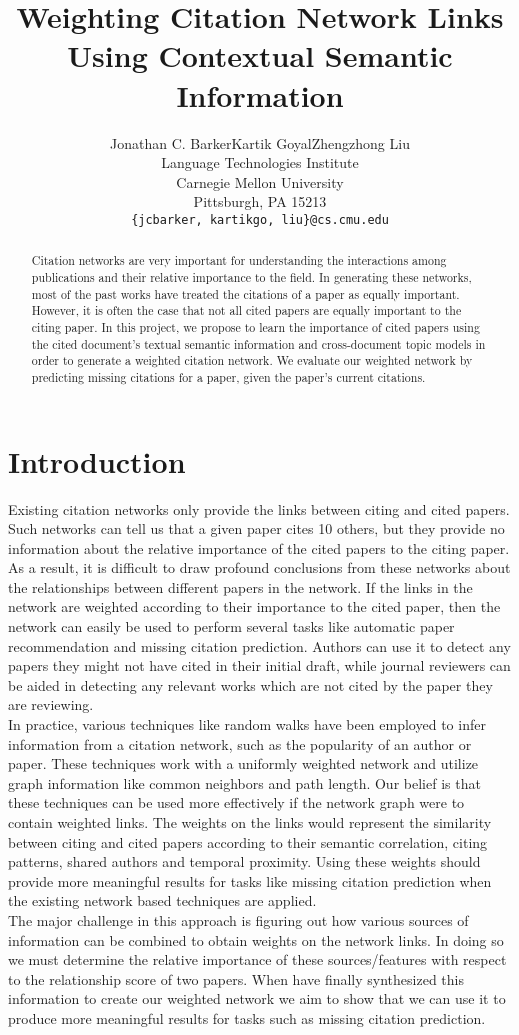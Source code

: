 \documentclass{article} %
\title{Weighting Citation Network Links Using Contextual Semantic Information}
\author{
Jonathan C. Barker\tab Kartik Goyal\tab Zhengzhong Liu \\
Language Technologies Institute \\
Carnegie Mellon University \\
Pittsburgh, PA 15213 \\
\texttt{\{jcbarker, kartikgo, liu\}@cs.cmu.edu} \\
}
\begin{document}
\maketitle

\begin{abstract}
Citation networks are very important for understanding the interactions among publications and their relative importance to the field. In generating these networks, most of the past works have treated the citations of a paper as equally important. However, it is often the case that not all cited papers are equally important to the citing paper. In this project, we propose to learn the importance of cited papers using the cited document's textual semantic information and cross-document topic models in order to generate a weighted citation network. We evaluate our weighted network by predicting missing citations for a paper, given the paper's current citations.
\end{abstract}

\section{Introduction}
Existing citation networks only provide the links between citing and cited papers. Such networks can tell us that a given paper cites 10 others, but they provide no information about the relative importance of the cited papers to the citing paper. As a result, it is difficult to draw profound conclusions from these networks about the relationships between different papers in the network. If the links in the network are weighted according to their importance to the cited paper, then the network can easily be used to perform several tasks like automatic paper recommendation and missing citation prediction. Authors can use it to detect any papers they might not have cited in their initial draft, while journal reviewers can be aided in detecting any relevant works which are not cited by the paper they are reviewing.\\
In practice, various techniques like random walks have been employed to infer information from a citation network, such as the popularity of an author or paper. These techniques work with a uniformly weighted network and utilize graph information like common neighbors and path length. Our belief is that these techniques can be used more effectively if the network graph were to contain weighted links. The weights on the links would represent the similarity between citing and cited papers according to their semantic correlation, citing patterns, shared authors and temporal proximity. Using these weights should provide more meaningful results for tasks like missing citation prediction when the existing network based techniques are applied.\\
The major challenge in this approach is figuring out how various sources of information can be combined to obtain weights on the network links. In doing so we must determine the relative importance of these sources/features with respect to the relationship score of two papers. When have finally synthesized this information to create our weighted network we aim to show that we can use it to produce more meaningful results for tasks such as missing citation prediction.
\end{document}
